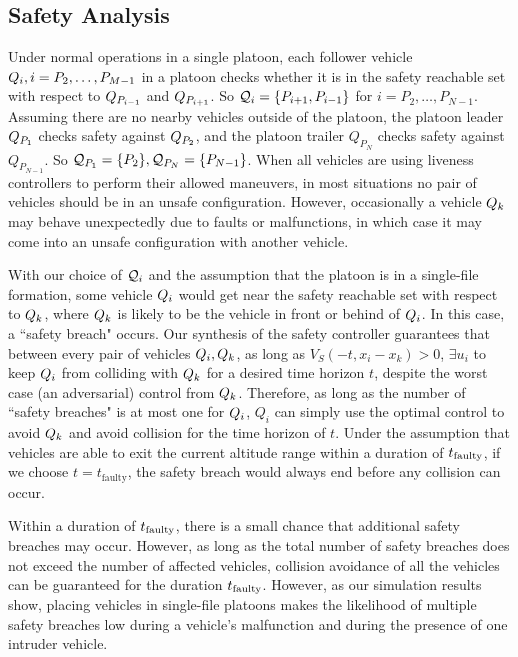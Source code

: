 \subsection{Safety Analysis}
Under normal operations in a single platoon, each follower vehicle $Q_{i},i=P_2,\ldots,P_{M-1}$ in a platoon checks whether it is in the safety reachable set with respect to $Q_{P_{i-1}}$ and $Q_{P_{i+1}}$. So $\mathcal{Q}_{i} = \{P_{i+1}, P_{i-1}\}$ for $i=P_2,\ldots,P_{N-1}$. Assuming there are no nearby vehicles outside of the platoon, the platoon leader $Q_{P_1}$ checks safety against $Q_{P_2}$, and the platoon trailer $Q_{P_N}$ checks safety against $Q_{P_{N-1}}$. So $\mathcal{Q}_{P_1}=\{P_2\}, \mathcal{Q}_{P_N}=\{P_{N-1}\}$. When all vehicles are using liveness controllers to perform their allowed maneuvers, in most situations no pair of vehicles should be in an unsafe configuration. However, occasionally a vehicle $Q_{k}$ may behave unexpectedly due to faults or malfunctions, in which case it may come into an unsafe configuration with another vehicle.

With our choice of $\mathcal{Q}_{i}$ and the assumption that the platoon is in a single-file formation, some vehicle $Q_{i}$ would get near the safety reachable set with respect to $Q_{k}$, where $Q_{k}$ is likely to be the vehicle in front or behind of $Q_{i}$. In this case, a ``safety breach" occurs. Our synthesis of the safety controller guarantees that between every pair of vehicles $Q_{i},Q_{k}$, as long as $V_S(-t,x_i- x_k)>0$, $\exists u_i$ to keep $Q_{i}$ from colliding with $Q_{k}$ for a desired time horizon $t$, despite the worst case (an adversarial) control from $Q_{k}$. Therefore, as long as the number of ``safety breaches" is at most one for $Q_{i}$, $Q_i$ can simply use the optimal control to avoid $Q_{k}$ and avoid collision for the time horizon of $t$. Under the assumption that vehicles are able to exit the current altitude range within a duration of $t_\text{faulty}$, if we choose $t=t_\text{faulty}$, the safety breach would always end before any collision can occur. 

Within a duration of $t_\text{faulty}$, there is a small chance that additional safety breaches may occur. However, as long as the total number of safety breaches does not exceed the number of affected vehicles, collision avoidance of all the vehicles can be guaranteed for the duration $t_\text{faulty}$. However, as our simulation results show, placing vehicles in single-file platoons makes the likelihood of multiple safety breaches low during a vehicle's malfunction and during the presence of one intruder vehicle. 

